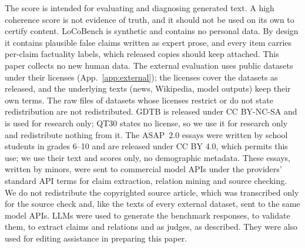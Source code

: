 The score is intended for evaluating and diagnosing generated text. A high coherence score is not
evidence of truth, and it should not be used on its own to certify content. LoCoBench is synthetic
and contains no personal data. By design it contains plausible false claims written as expert prose,
and every item carries per-claim factuality labels, which released copies should keep attached.
This paper collects no new human data. The external evaluation uses public datasets under their licenses (App.~\ref{app:external}); the
licenses cover the datasets as released, and the underlying texts (news, Wikipedia, model outputs)
keep their own terms. The raw files of datasets whose licenses restrict or do not
state redistribution are not redistributed. GDTB is released under CC BY-NC-SA and is used for
research only; QT30 states no license, so we use it for research only and redistribute nothing from
it. The ASAP~2.0 essays were written by school students in grades 6--10 and are released under CC BY
4.0, which permits this use; we use their text and scores only, no demographic metadata. These essays, written by minors, were
sent to commercial model APIs under the providers' standard API terms for claim extraction, relation
mining and source checking. We do not redistribute the
copyrighted source article, which was transcribed only for the source check and, like the texts of
every external dataset, sent to the same model APIs. LLMs were used to generate the benchmark
responses, to validate them, to extract claims and relations and as judges, as described. They
were also used for editing assistance in preparing this paper.
